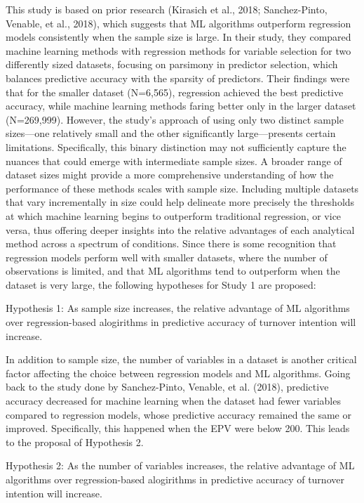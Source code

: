 \documentclass[
  man]{apa7}
\begin{document}
This study is based on prior research (Kirasich et al., 2018; Sanchez-Pinto, Venable, et al., 2018), which suggests that ML algorithms outperform regression models consistently when the sample size is large.
In their study, they compared machine learning methods with regression methods for variable selection for two differently sized datasets, focusing on parsimony in predictor selection, which balances predictive accuracy with the sparsity of predictors.
Their findings were that for the smaller dataset (N=6,565), regression achieved the best predictive accuracy, while machine learning methods faring better only in the larger dataset (N=269,999).
However, the study's approach of using only two distinct sample sizes---one relatively small and the other significantly large---presents certain limitations. Specifically, this binary distinction may not sufficiently capture the nuances that could emerge with intermediate sample sizes. A broader range of dataset sizes might provide a more comprehensive understanding of how the performance of these methods scales with sample size. Including multiple datasets that vary incrementally in size could help delineate more precisely the thresholds at which machine learning begins to outperform traditional regression, or vice versa, thus offering deeper insights into the relative advantages of each analytical method across a spectrum of conditions.
Since there is some recognition that regression models perform well with smaller datasets, where the number of observations is limited, and that ML algorithms tend to outperform when the dataset is very large, the following hypotheses for Study 1 are proposed:

Hypothesis 1: As sample size increases, the relative advantage of ML algorithms over regression-based alogirithms in predictive accuracy of turnover intention will increase.

In addition to sample size, the number of variables in a dataset is another critical factor affecting the choice between regression models and ML algorithms.
Going back to the study done by Sanchez-Pinto, Venable, et al. (2018), predictive accuracy decreased for machine learning when the dataset had fewer variables compared to regression models, whose predictive accuracy remained the same or improved.
Specifically, this happened when the EPV were below 200.
This leads to the proposal of Hypothesis 2.

Hypothesis 2: As the number of variables increases, the relative advantage of ML algorithms over regression-based alogirithms in predictive accuracy of turnover intention will increase.
\end{document}
